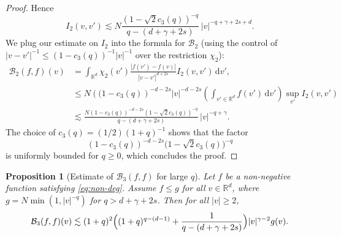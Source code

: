 \documentclass[11pt]{article}
\theoremstyle{plain}
\newtheorem{prop}[thm]{Proposition}
\theoremstyle{definition}
\numberwithin{equation}{section}
\newcommand{\R}{\mathbb R}
\newcommand{\dd} {\, \mathrm{d}}
\let\A N
\begin{document}
\begin{proof}
Hence
\[
I_2(v,v') \lesssim \A \frac{\left(1-\sqrt 2 c_3(q)\right)^{-q}}{q-(d+\gamma + 2s)}\, |v|^{-q+\gamma+2s +d}.
\]
We plug our estimate on $I_2$ into the formula for $\mathcal B_2$
(using the control of $|v-v'|^{-1} \le (1-c_3(q))^{-1} |v|^{-1}$ over the
restriction $\chi_2$):
\begin{align*}
\mathcal{B}_2 (f,f)(v) &= \int_{\R^d} \chi_2(v')
\frac{\big[f(v')-f(v)\big]}{|v-v'|^{d+2s}} I_2(v,v') \dd v', \\
&\leq \A \left((1-c_3(q)\right)^{-d-2s} |v|^{-d-2s} \left( \int_{v'\in \R^d} f(v') \dd
v'\right) \sup_{v'} I_2(v,v') \\
& \lesssim \frac{\A \left(1-c_3(q)\right)^{-d-2s} \left(1-\sqrt{2}c_3(q)\right)^{-q}}{q-(d+\gamma + 2s)}\, |v|^{-q+\gamma}.
\end{align*}
The choice of
$c_3(q) = (1/2)(1+q)^{-1}$ shows that the factor
\[
\left(1-c_3(q)\right)^{-d-2s} \bigl(1-\sqrt{2}c_3(q)\bigr)^{-q}
\]
is
uniformly bounded for $q \ge 0$, which concludes the proof.
\end{proof}

\begin{prop}[Estimate of $\mathcal{B}_3(f,f)$ for large $q$] \label{prop:B3} Let $f$ be a non-negative function satisfying \eqref{eq:non-deg}. Assume $f \leq g$ for all $v \in \R^d$, where {$g = \A \min(1,|v|^{-q})$} for
$q> d+\gamma +2s$. Then for all $|v| \ge 2$,
\[ \mathcal{B}_3 (f,f)(v) \lesssim (1+q)^2 \Bigl( (1+q)^{q-(d-1)} +
\frac{1}{q-(d+\gamma+2s)} \Bigr) |v|^{\gamma -2} g(v).\]
\end{prop}
\end{document}
